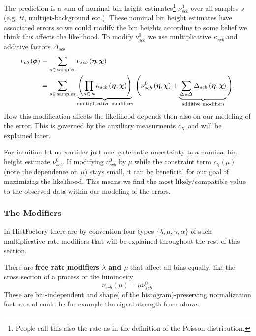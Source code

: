 The prediction is a sum of nominal bin height estimates\footnote{People call this also the rate as in the definition of the Poisson distribution.} $\nu_{scb}^0$ over all samples $s$ (e.g. $t\overline{t}$, multijet-background etc.). These nominal bin height estimates have associated errors so we could modify the bin heights according to some belief we think this affects the likelihood. To modify $\nu_{scb}^0$ we use multiplicative $\kappa_{scb}$ and additive factors $\Delta_{scb}$
\begin{align}
    \nu_{cb}\left(\bm{\phi}\right) &= \sum_{s\in\mathrm{\,samples}} \nu_{scb}\left(\bm{\eta},\bm{\chi}\right)\\ &= \sum_{s\in\mathrm{\,samples}}\underbrace{\left(\prod_{\kappa\in\,\bm{\kappa}} \kappa_{scb}\left(\bm{\eta},\bm{\chi}\right)\right)}_{\text{multiplicative modifiers}}\, \Bigg(\nu_{scb}^0\left(\bm{\eta}, \bm{\chi}\right) + \underbrace{\sum_{\Delta\in\bm{\Delta}} \Delta_{scb}\left(\bm{\eta},\bm{\chi}\right)}_{\text{additive modifiers}}\Bigg).
\end{align}
How this modification affects the likelihood depends then also on our modeling of the error. This is governed by the auxiliary measurments $c_{\chi}$ and will be explained later.

For intuition let us consider just one systematic uncertainty to a nominal bin height estimate $\nu_{scb}^0$. If modifying $\nu_{scb}^0$ by $\mu$ while the constraint term $c_\chi(\mu)$ (note the dependence on $\mu$) stays small, it can be beneficial for our goal of maximizing the likelihood. This means we find the most likely/compatible value to the observed data within our modeling of the errors. 

\subsubsection*{The Modifiers}
In HistFactory there are by convention four types $\{\lambda,\mu,\gamma,\alpha\}$ of such multiplicative rate modifiers that will be explained throughout the rest of this section. 

There are \textbf{free rate modifiers $\lambda$ and $\mu$} that affect all bins equally, like the cross section of a process or the luminosity 
\begin{equation}
    \nu_{scb}(\mu)=\mu \nu_{scb}^0.
\end{equation}
These are bin-independent and shape( of the histogram)-preserving normalization factors and could be for example the signal strength from above.

